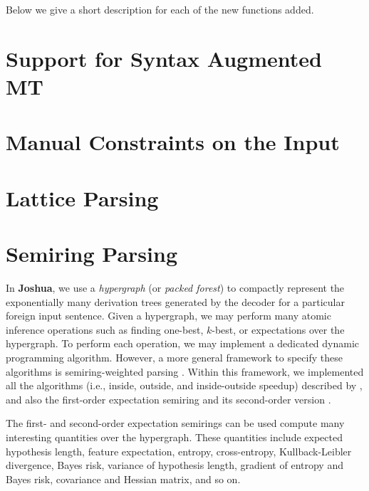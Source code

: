 \documentclass[11pt]{article}
\newcommand{\joshua}{\textbf{Joshua}}
\begin{document}
Below we give a short description for each of the new functions added.


\section{Support for Syntax Augmented MT}


\section{Manual Constraints on the Input}

\section{Lattice Parsing}


\section{Semiring Parsing}

In \joshua, we use a {\em hypergraph} (or {\em packed forest}) to compactly 
represent the exponentially many derivation trees generated by the decoder for a 
particular foreign input sentence.
Given a hypergraph, we may perform many atomic inference operations
such as finding one-best, $k$-best, or expectations over the hypergraph.
To perform each operation, we may implement a dedicated dynamic programming algorithm.
However, a more general framework to specify these algorithms is semiring-weighted parsing \cite{semiringparsing}.
Within this framework, we implemented all the algorithms (i.e.,
inside, outside, and inside-outside speedup) described by ,
and also the first-order expectation semiring \cite{eisner-expectation-semiring} and its
second-order version \cite{li-eisner:2009:EMNLP}.


The first- and second-order expectation semirings can be used compute many interesting quantities over the hypergraph.
These quantities include expected hypothesis length, feature expectation, entropy, cross-entropy, Kullback-Leibler divergence,
Bayes risk, variance of hypothesis length, gradient of entropy and Bayes risk, covariance and Hessian matrix, and so on.
\end{document}
